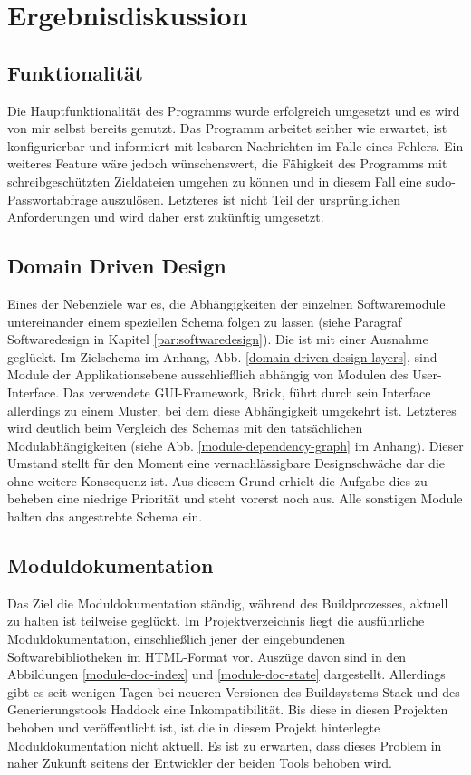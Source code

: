 \section{Ergebnisdiskussion} \label{Ergebnisdiskussion}

\subsection{Funktionalität}
Die Hauptfunktionalität des Programms wurde erfolgreich umgesetzt und es wird von
mir selbst bereits genutzt. Das Programm arbeitet seither wie erwartet,
ist konfigurierbar und informiert mit lesbaren Nachrichten im Falle eines Fehlers.
Ein weiteres Feature wäre jedoch wünschenswert, die Fähigkeit des Programms mit
schreibgeschützten Zieldateien umgehen zu können und in diesem Fall eine
sudo-Passwortabfrage auszulösen. Letzteres ist nicht Teil der
ursprünglichen Anforderungen und wird daher erst zukünftig umgesetzt.

\subsection{Domain Driven Design} \label{domain-driven-design-result}
Eines der Nebenziele war es, die Abhängigkeiten der einzelnen Softwaremodule
untereinander einem speziellen Schema folgen zu lassen (siehe Paragraf
Softwaredesign in Kapitel \ref{par:softwaredesign}). Die ist mit einer Ausnahme
geglückt. Im Zielschema im Anhang, Abb. \ref{domain-driven-design-layers}, sind Module
der Applikationsebene ausschließlich abhängig von Modulen des User-Interface.
Das verwendete \gls{GUI}-Framework, Brick, führt durch sein Interface allerdings
zu einem Muster, bei dem diese Abhängigkeit umgekehrt ist. Letzteres wird deutlich
beim Vergleich des Schemas mit den tatsächlichen Modulabhängigkeiten (siehe Abb.
\ref{module-dependency-graph} im Anhang). Dieser Umstand stellt für den Moment
eine vernachlässigbare Designschwäche dar die ohne weitere
Konsequenz ist. Aus diesem Grund erhielt die Aufgabe dies zu beheben eine niedrige
Priorität und steht vorerst noch aus. Alle sonstigen Module halten das angestrebte
Schema ein.

\subsection{Moduldokumentation}
Das Ziel die Moduldokumentation ständig, während des Buildprozesses, aktuell zu
halten ist teilweise geglückt. Im Projektverzeichnis liegt die ausführliche Moduldokumentation,
einschließlich jener der eingebundenen Softwarebibliotheken im HTML-Format vor.
Auszüge davon sind in den Abbildungen \ref{module-doc-index} und \ref{module-doc-state} dargestellt.
Allerdings gibt es seit wenigen Tagen bei neueren Versionen des Buildsystems Stack \cite{stack}
und des Generierungstools Haddock \cite{haddock} eine Inkompatibilität. Bis diese
in diesen Projekten behoben und veröffentlicht ist, ist die in diesem Projekt hinterlegte
Moduldokumentation nicht aktuell. Es ist zu erwarten, dass dieses Problem in naher
Zukunft seitens der Entwickler der beiden Tools behoben wird.

